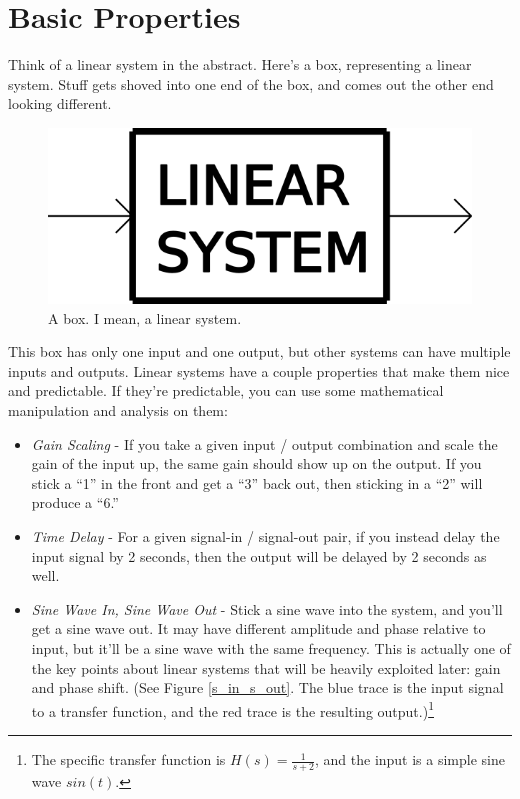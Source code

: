 \section{Basic Properties}

Think of a linear system in the abstract. Here's a box, representing a linear system. Stuff gets shoved into one end of the box, and comes out the other end looking different.

\begin{figure}[h]
\centering
\includegraphics[scale=1.0]{linear_box.png}
\caption{A box. I mean, a linear system.}\label{abox}
\end{figure}

This box has only one input and one output, but other systems can have multiple inputs and outputs. Linear systems have a couple properties that make them nice and predictable. If they're predictable, you can use some mathematical manipulation and analysis on them:

\begin{itemize}
\item \emph{Gain Scaling} - If you take a given input / output combination and scale the gain of the input up, the same gain should show up on the output. If you stick a ``1'' in the front and get a ``3'' back out, then sticking in a ``2'' will produce a ``6.''
\item \emph{Time Delay} - For a given signal-in / signal-out pair, if you instead delay the input signal by 2 seconds, then the output will be delayed by 2 seconds as well.
\item \emph{Sine Wave In, Sine Wave Out} - Stick a sine wave into the system, and you'll get a sine wave out. It may have different amplitude and phase relative to input, but it'll be a sine wave with the same frequency. This is actually one of the key points about linear systems that will be heavily exploited later: gain and phase shift. (See Figure \ref{s_in_s_out}. The blue trace is the input signal to a transfer function, and the red trace is the resulting output.)\footnote{The specific transfer function is $H(s) = \frac{1}{s+2}$, and the input is a simple sine wave $sin(t)$.}

\end{itemize}

